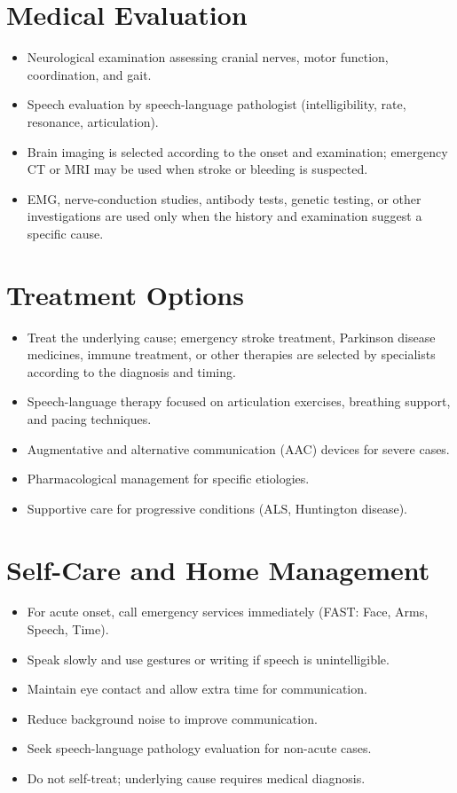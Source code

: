 \section*{Medical Evaluation}
\begin{itemize}
  \item Neurological examination assessing cranial nerves, motor function, coordination, and gait.
  \item Speech evaluation by speech-language pathologist (intelligibility, rate, resonance, articulation).
  \item Brain imaging is selected according to the onset and examination; emergency CT or MRI may be used when stroke or bleeding is suspected.
  \item EMG, nerve-conduction studies, antibody tests, genetic testing, or other investigations are used only when the history and examination suggest a specific cause.
\end{itemize}

\section*{Treatment Options}
\begin{itemize}
  \item Treat the underlying cause; emergency stroke treatment, Parkinson disease medicines, immune treatment, or other therapies are selected by specialists according to the diagnosis and timing.
  \item Speech-language therapy focused on articulation exercises, breathing support, and pacing techniques.
  \item Augmentative and alternative communication (AAC) devices for severe cases.
  \item Pharmacological management for specific etiologies.
  \item Supportive care for progressive conditions (ALS, Huntington disease).
\end{itemize}

\section*{Self-Care and Home Management}
\begin{itemize}
  \item For acute onset, call emergency services immediately (FAST: Face, Arms, Speech, Time).
  \item Speak slowly and use gestures or writing if speech is unintelligible.
  \item Maintain eye contact and allow extra time for communication.
  \item Reduce background noise to improve communication.
  \item Seek speech-language pathology evaluation for non-acute cases.
  \item Do not self-treat; underlying cause requires medical diagnosis.
\end{itemize}

